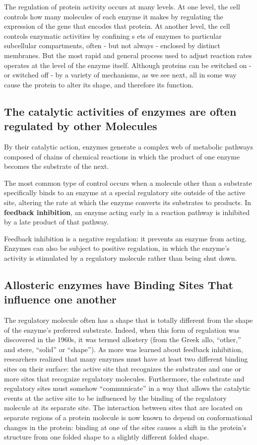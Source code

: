 The regulation of protein activity occurs at many levels. At one level, the
cell controls how many molecules of each enzyme it makes by regulating
the expression of the gene that encodes that protein.
At another level, the cell controls enzymatic activities by confining s
ets of enzymes to particular subcellular compartments, often - but
not always - enclosed by distinct membranes.
But the most rapid and general process used to adjust reaction
rates operates at the level of the enzyme itself. Although proteins can be
switched on - or switched off - by a variety of mechanisms, as we see
next, all in some way cause the protein to alter its shape, and therefore
its function.

\subsection{The catalytic activities of enzymes are often regulated by other Molecules}

By their catalytic action, enzymes generate a complex web of metabolic pathways
composed of chains of chemical reactions in which the product of
one enzyme becomes the substrate of the next.

The most common type of control occurs when a molecule other than a
substrate specifically binds to an enzyme at a special regulatory site outside
of the active site, altering the rate at which the enzyme converts its
substrates to products. In \textbf{feedback inhibition}, an enzyme acting early in
a reaction pathway is inhibited by a late product of that pathway.

Feedback inhibition is a negative regulation: it prevents an enzyme from
acting. Enzymes can also be subject to positive regulation, in which the
enzyme’s activity is stimulated by a regulatory molecule rather than being
shut down.

\subsection{Allosteric enzymes have Binding Sites That influence one another}

The regulatory molecule often has a shape that is totally
different from the shape of the enzyme’s preferred substrate. Indeed,
when this form of regulation was discovered in the 1960s, it was termed
allostery (from the Greek allo, “other,” and stere, “solid” or “shape”). As
more was learned about feedback inhibition, researchers realized that
many enzymes must have at least two different binding sites on their
surface: the active site that recognizes the substrates and one or more
sites that recognize regulatory molecules. Furthermore, the substrate and
regulatory sites must somehow “communicate” in a way that allows the
catalytic events at the active site to be influenced by the binding of the
regulatory molecule at its separate site.
The interaction between sites that are located on separate regions of a
protein molecule is now known to depend on conformational changes
in the protein: binding at one of the sites causes a shift in the protein’s
structure from one folded shape to a slightly different folded shape.

